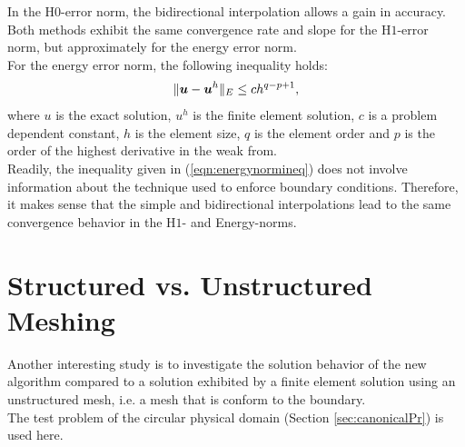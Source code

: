 \documentclass[a4paper,12pt]{article}
\newcommand{\mb}[1]{{\mbox{\boldmath$#1$\unboldmath}}}
\begin{document}
In the H$0$-error norm, the bidirectional interpolation allows a gain in accuracy. Both methods exhibit the same convergence rate and slope for the H$1$-error norm, but approximately for the energy error norm.\\
For the energy error norm, the following inequality holds:
\begin{equation}\label{eqn:energynormineq}
 \Vert \mb{u} - \mb{u}^h \Vert _E \leq c h^{q-p+1},
\end{equation}
where $u$ is the exact solution, $u^h$ is the finite element solution, $c$ is a problem dependent constant, $h$ is the element size, $q$ is the element order and $p$ is the order of the highest derivative in the weak from. \\
Readily, the inequality given in (\ref{eqn:energynormineq}) does not involve information about the technique used to enforce boundary conditions. Therefore, it makes sense that the simple and bidirectional interpolations lead to the same convergence behavior in the H$1$- and Energy-norms.\\
\section{Structured vs. Unstructured Meshing}
Another interesting study is to investigate the solution behavior of the new algorithm compared to a solution exhibited by a finite element solution using an unstructured mesh, i.e. a mesh that is conform to the boundary. \\
The test problem of the circular physical domain (Section \ref{sec:canonicalPr}) is used here. 
\end{document}
